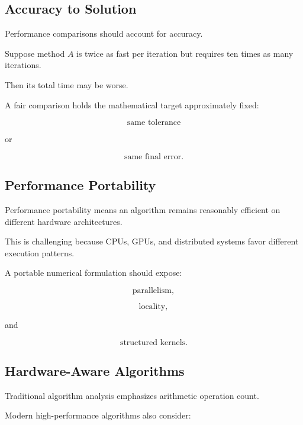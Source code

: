 \subsection{Accuracy to Solution}
\label{subsec:accuracy-to-solution}

Performance comparisons should account for accuracy.

Suppose method \(A\) is twice as fast per iteration but requires ten times
as many iterations.

Then its total time may be worse.

A fair comparison holds the mathematical target approximately fixed:

\[
\boxed{
\text{same tolerance}
}
\]

or

\[
\boxed{
\text{same final error}.
}
\]

\subsection{Performance Portability}
\label{subsec:hpmc-performance-portability}

Performance portability means an algorithm remains reasonably efficient on
different hardware architectures.

This is challenging because CPUs, GPUs, and distributed systems favor
different execution patterns.

A portable numerical formulation should expose:

\[
\boxed{
\text{parallelism},
}
\]

\[
\boxed{
\text{locality},
}
\]

and

\[
\boxed{
\text{structured kernels}.
}
\]

\subsection{Hardware-Aware Algorithms}
\label{subsec:hardware-aware-algorithms}

Traditional algorithm analysis emphasizes arithmetic operation count.

Modern high-performance algorithms also consider:

